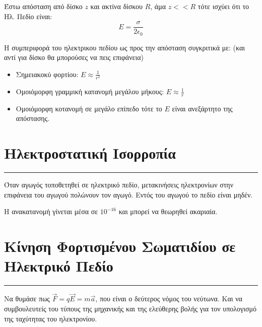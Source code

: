 \documentclass[a4paper,12pt]{article}
\begin{document}
Έστω απόσταση από δίσκο $z$ και ακτίνα δίσκου $R$, άμα $z<<R$ τότε ισχύει ότι το Ηλ. Πεδίο είναι:
$$E = \frac{\sigma}{2\epsilon_0}$$

Η συμπεριφορά του ηλεκτρικου πεδίου ως προς την απόσταση συγκριτικά με: (και αντί για δίσκο θα μπορούσες να πεις επιφάνεια)
\begin{itemize}
    \item Σημειακοκύ φορτίου: $E \approx \frac{1}{r^2}$
    \item Ομοιόμορφη γραμμική κατανομή μεγάλου μήκους: $E \approx \frac{1}{r}$
    \item Ομοιόμορφη κοτανομή σε μεγάλο επίπεδο τότε το $E$ είναι ανεξάρτητο της απόστασης.
\end{itemize}

\section*{Ηλεκτροστατική Ισορροπία}
\vspace{-.4cm}
\hrule
\vspace{0.3cm}

Όταν αγωγός τοποθετηθεί σε ηλεκτρικό πεδίο,
μετακινήσεις ηλεκτρονίων στην επιφάνεια του
αγωγού πολώνουν τον αγωγό. Εντός του
αγωγού το πεδίο είναι μηδέν.

Η ανακατανομή γίνεται μέσα σε $10^{-16}$ και μπορεί να
θεωρηθεί ακαριαία.

\section*{Κίνηση Φορτισμένου Σωματιδίου σε Ηλεκτρικό Πεδίο}
\vspace{-.4cm}
\hrule
\vspace{0.3cm}

Να θυμάσε πως $\vec{F} = q\vec{E} = m\vec{a}$, που είναι ο δεύτερος νόμος του νεύτωνα. 
Και να συμβουλευτείς του τύπους της μηχανικής και της ελεύθερης βολής για τον υπολογισμό
της ταχύτητας του ηλεκτρονίου.
\end{document}
